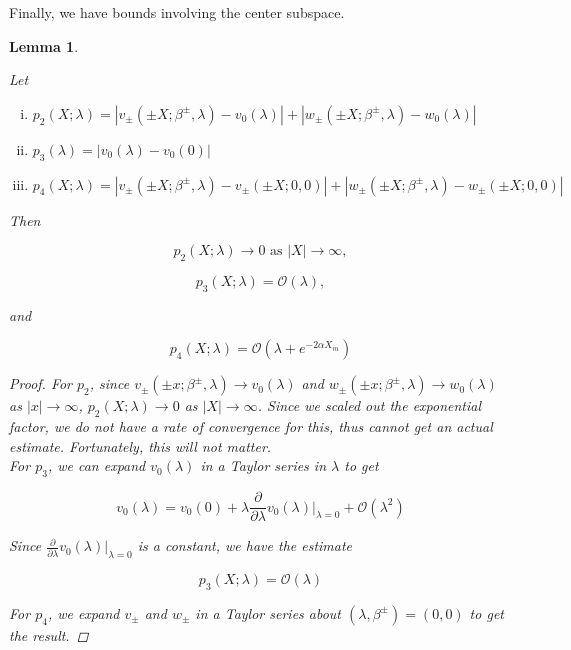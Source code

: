 \documentclass[12pt]{article}
\newtheorem{lemma}{Lemma}
\begin{document}
Finally, we have bounds involving the center subspace.


\begin{lemma}\label{centerbounds}

Let
\begin{enumerate}[(i)]
\item $p_2(X; \lambda) = |v_\pm(\pm X; \beta^\pm, \lambda) - v_0(\lambda)| + |w_\pm(\pm X; \beta^\pm, \lambda) - w_0(\lambda)|$
\item $p_3(\lambda) = |v_0(\lambda) - v_0(0)|$
\item $p_4(X; \lambda) = |v_\pm(\pm X; \beta^\pm, \lambda) - v_\pm(\pm X; 0, 0)| + |w_\pm(\pm X; \beta^\pm, \lambda) - w_\pm(\pm X; 0, 0)|$
\end{enumerate}

Then 

\begin{equation}\label{p2limit}
p_2(X; \lambda) \rightarrow 0 \text{ as } |X| \rightarrow \infty,
\end{equation}

\begin{equation}\label{p3bound}
p_3(X; \lambda) = \mathcal{O}(\lambda),
\end{equation}

and

\begin{equation}\label{p3bound}
p_4(X; \lambda) = \mathcal{O}(\lambda + e^{-2 \alpha X_m} )
\end{equation}

\begin{proof}

For $p_2$, since $v_\pm(\pm x; \beta^\pm, \lambda) \rightarrow v_0(\lambda)$ and $w_\pm(\pm x; \beta^\pm, \lambda) \rightarrow w_0(\lambda)$ as $|x| \rightarrow \infty$, $p_2(X; \lambda) \rightarrow 0$ as $|X| \rightarrow \infty$. Since we scaled out the exponential factor, we do not have a rate of convergence for this, thus cannot get an actual estimate. Fortunately, this will not matter.\\

For $p_3$, we can expand $v_0(\lambda)$ in a Taylor series in $\lambda$ to get

\[
v_0(\lambda) = v_0(0) + \lambda \frac{\partial}{\partial \lambda}v_0(\lambda)\Big|_{\lambda = 0} + \mathcal{O}(\lambda^2)
\]

Since $\frac{\partial}{\partial \lambda}v_0(\lambda)\Big|_{\lambda = 0}$ is a constant, we have the estimate

\[
p_3(X; \lambda) = \mathcal{O}(\lambda) 
\]

For $p_4$, we expand $v_\pm$ and $w_\pm$ in a Taylor series about $(\lambda, \beta^\pm) = (0, 0)$ to get the result.

\end{proof}
\end{lemma}
\end{document}
